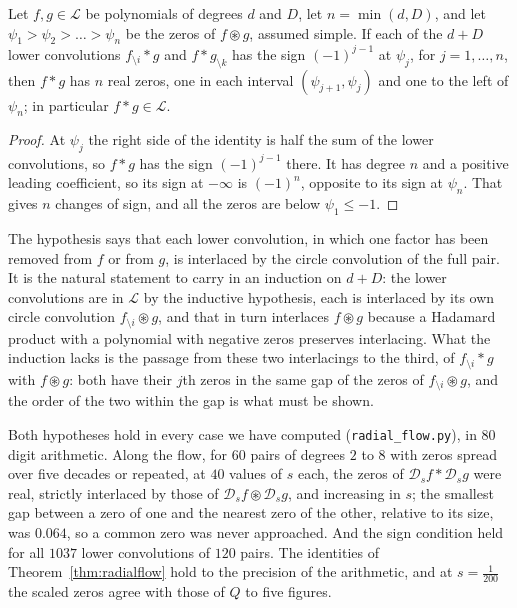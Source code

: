 \begin{theorem}\label{thm:signcriterion}
Let $f,g\in\mathcal L$ be polynomials of degrees $d$ and $D$, let $n=\min(d,D)$, and let $\psi_1>\psi_2>\dots>\psi_n$ be the zeros of $f\circledast g$, assumed simple. If each of the $d+D$ lower convolutions $f_{\setminus i}*g$ and $f*g_{\setminus k}$ has the sign $(-1)^{j-1}$ at $\psi_j$, for $j=1,\dots,n$, then $f*g$ has $n$ real zeros, one in each interval $(\psi_{j+1},\psi_j)$ and one to the left of $\psi_n$; in particular $f*g\in\mathcal L$.
\end{theorem}

\begin{proof}
At $\psi_j$ the right side of the identity is half the sum of the lower convolutions, so $f*g$ has the sign $(-1)^{j-1}$ there. It has degree $n$ and a positive leading coefficient, so its sign at $-\infty$ is $(-1)^n$, opposite to its sign at $\psi_n$. That gives $n$ changes of sign, and all the zeros are below $\psi_1\le-1$.
\end{proof}

The hypothesis says that each lower convolution, in which one factor has been removed from $f$ or from $g$, is interlaced by the circle convolution of the full pair. It is the natural statement to carry in an induction on $d+D$: the lower convolutions are in $\mathcal L$ by the inductive hypothesis, each is interlaced by its own circle convolution $f_{\setminus i}\circledast g$, and that in turn interlaces $f\circledast g$ because a Hadamard product with a polynomial with negative zeros preserves interlacing. What the induction lacks is the passage from these two interlacings to the third, of $f_{\setminus i}*g$ with $f\circledast g$: both have their $j$th zeros in the same gap of the zeros of $f_{\setminus i}\circledast g$, and the order of the two within the gap is what must be shown.

Both hypotheses hold in every case we have computed (\texttt{radial\_flow.py}), in $80$ digit arithmetic. Along the flow, for $60$ pairs of degrees $2$ to $8$ with zeros spread over five decades or repeated, at $40$ values of $s$ each, the zeros of $\mathcal D_sf*\mathcal D_sg$ were real, strictly interlaced by those of $\mathcal D_sf\circledast \mathcal D_sg$, and increasing in $s$; the smallest gap between a zero of one and the nearest zero of the other, relative to its size, was $0.064$, so a common zero was never approached. And the sign condition held for all $1037$ lower convolutions of $120$ pairs. The identities of Theorem~\ref{thm:radialflow} hold to the precision of the arithmetic, and at $s=\frac1{200}$ the scaled zeros agree with those of $Q$ to five figures.

